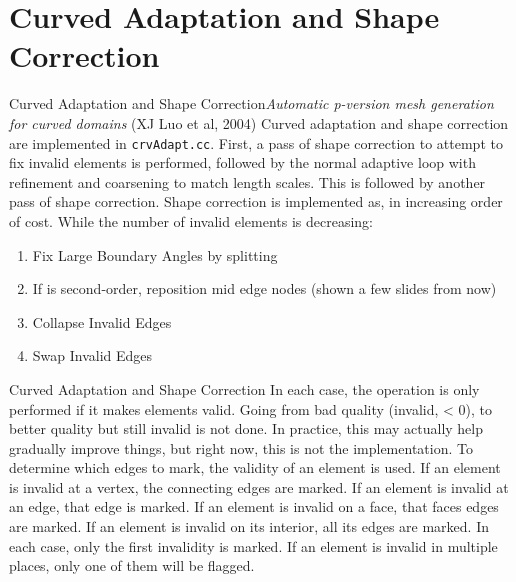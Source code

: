 \documentclass[12pt]{beamer}
\newcommand{\spa}{\vspace{0.5cm}\newline}
\begin{document}
\section{Curved Adaptation and Shape Correction}

\begin{frame}{Curved Adaptation and Shape Correction}{\textit{Automatic p-version mesh generation for curved domains} (XJ Luo et al, 2004)}
Curved adaptation and shape correction are implemented in \texttt{crvAdapt.cc}. First, a pass of shape correction to attempt to fix invalid elements is performed, followed by the normal adaptive loop with refinement and coarsening to match length scales. This is followed by another pass of shape correction. Shape correction is implemented as, in increasing order of cost.\spa
While the number of invalid elements is decreasing:
\begin{enumerate}
\item Fix Large Boundary Angles by splitting
\item If is second-order, reposition mid edge nodes (shown a few slides from now)
\item Collapse Invalid Edges
\item Swap Invalid Edges
\end{enumerate}
\end{frame}
\begin{frame}{Curved Adaptation and Shape Correction}
In each case, the operation is only performed if it makes elements valid. Going from bad quality (invalid, < 0), to better quality but still invalid is not done. In practice, this may actually help gradually improve things, but right now, this is not the implementation. \spa
To determine which edges to mark, the validity of an element is used. \spa
If an element is invalid at a vertex, the connecting edges are marked. \spa
If an element is invalid at an edge, that edge is marked. \spa
If an element is invalid on a face, that faces edges are marked. \spa
If an element is invalid on its interior, all its edges are marked. \spa
In each case, only the first invalidity is marked. If an element is invalid in multiple places, only one of them will be flagged.
\end{frame}
\end{document}
